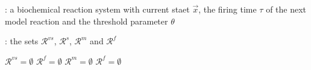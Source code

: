 
\begin{algorithm}[H]
\DontPrintSemicolon
{}

\caption{\protect\TitleFunction{}}
\label{algo:four-class-reaction-partitioning}

\Input: a biochemical reaction system with current staet $\vec{x}$, the firing time $\tau$ of the next model reaction and the threshold parameter $\theta$\;

\Output: the sets $\mathcal{R}^{vs}$, $\mathcal{R}^s$, $\mathcal{R}^m$ and $\mathcal{R}^f$\;

$\mathcal{R}^{vs} = \emptyset$\;
$\mathcal{R}^f = \emptyset$\;
$\mathcal{R}^m = \emptyset$\;
$\mathcal{R}^f = \emptyset$\;

\end{algorithm}
